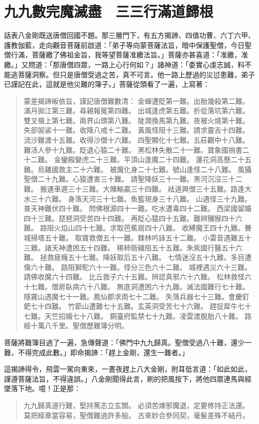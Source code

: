 
\chapter{九九數完魔滅盡　三三行滿道歸根}

話表八金剛既送唐僧回國不題。那三層門下，有五方揭諦、四值功曹、六丁六甲、護教伽藍，走向觀音菩薩前啟道：「弟子等向蒙菩薩法旨，暗中保護聖僧，今日聖僧行滿，菩薩繳了佛祖金旨，我等望菩薩准繳法旨。」菩薩亦甚喜道：「准繳，准繳。」又問道：「那唐僧四眾，一路上心行何如？」諸神道：「委實心虔志誠，料不能逃菩薩洞察。但只是唐僧受過之苦，真不可言。他一路上歷過的災愆患難，弟子已謹記在此，這就是他災難的簿子。」菩薩從頭看了一遍，上寫著：
\begin{quote}
蒙差揭諦皈依旨，謹記唐僧難數清：
金蟬遭貶第一難。出胎幾殺第二難。
滿月拋江第三難。尋親報冤第四難。
出城逢虎第五難。折從落坑第六難。
雙叉嶺上第七難。兩界山頭第八難。
陡澗換馬第九難。夜被火燒第十難。
失卻袈裟十一難。收降八戒十二難。
黃風怪阻十三難。請求靈吉十四難。
流沙難渡十五難。收得沙僧十六難。
四聖顯化十七難。五莊觀中十八難。
難活人參十九難。貶退心猿二十難。
黑松林失散二十一難。寶象國捎書二十二難。
金鑾殿變虎二十三難。平頂山逢魔二十四難。
蓮花洞高懸二十五難。烏雞國救主二十六難。
被魔化身二十七難。號山逢怪二十八難。
風攝聖僧二十九難。心猿遭害三十難。
請聖降妖三十一難。黑河沉沒三十二難。
搬運車遲三十三難。大賭輸贏三十四難。
祛道興僧三十五難。路逢大水三十六難。
身落天河三十七難。魚籃現身三十八難。
山遇怪三十九難。普天神難伏四十難。
問佛根源四十一難。吃水遭毒四十二難。
西梁國留婚四十三難。琵琶洞受苦四十四難。
再貶心猿四十五難。難辨獼猴四十六難。
路阻火焰山四十七難。求取芭蕉扇四十八難。
收縛魔王四十九難。賽城掃塔五十難。
取寶救僧五十一難。棘林吟詠五十二難。
小雷音遇難五十三難。諸天神遭困五十四難。
稀柿衕穢阻五十五難。朱紫國行醫五十六難。
拯救疲癃五十七難。降妖取后五十八難。
七情迷沒五十九難。多目遭傷六十難。
路阻獅駝六十一難。怪分三色六十二難。
城裡遇災六十三難。請佛收魔六十四難。
比丘救子六十五難。辨認真邪六十六難。
松林救怪六十七難。僧房臥病六十八難。
無底洞遭困六十九難。滅法國難行七十難。
隱霧山遇魔七十一難。鳳仙郡求雨七十二難。
失落兵器七十三難。會慶釘鈀七十四難。
竹節山遭難七十五難。玄英洞受苦七十六難。
趕捉犀牛七十七難。天竺招婚七十八難。
銅臺府監禁七十九難。凌雲渡脫胎八十難。
路經十萬八千里。聖僧歷難簿分明。
\end{quote}

菩薩將難簿目過了一遍，急傳聲道：「佛門中九九歸真。聖僧受過八十難，還少一難，不得完成此數。」即命揭諦：「趕上金剛，還生一難者。」

這揭諦得令，飛雲一駕向東來，一晝夜趕上八大金剛，附耳低言道：「如此如此，謹遵菩薩法旨，不得違誤。」八金剛聞得此言，刷的把風按下，將他四眾連馬與經墜落下地。噫！正是那：
\begin{quote}
九九歸真道行難，堅持篤志立玄關。
必須苦煉邪魔退，定要修持正法還。
莫把經章當容易，聖僧難過許多般。
古來妙合參同契，毫髮差殊不結丹。
\end{quote}

